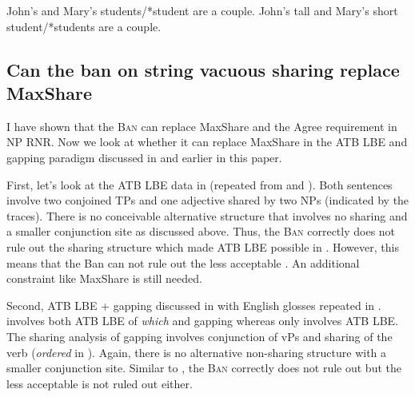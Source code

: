 \documentclass[output=paper]{langscibook}
\begin{document}
\ea 
	\label{shenex32}
	\ea 
		John's and Mary's students/*student are a couple.
	\ex 
		John's tall and Mary's short student/*students are a couple.
	\z 
\z 

\subsection{Can the ban on string vacuous sharing replace MaxShare}
\label{shensect:replace}

I have shown that the \textsc{Ban} can replace MaxShare and the Agree requirement in NP RNR. Now we look at whether it can replace MaxShare in the ATB LBE and gapping paradigm discussed in \citet{Citko:2006} and earlier in this paper.

First, let's look at the ATB LBE data in  (repeated from  and ). 
Both sentences involve two conjoined TPs and one adjective shared by two NPs (indicated by the traces). 
There is no conceivable alternative structure that involves no sharing and a smaller conjunction site as discussed above.  
Thus, the \textsc{Ban} correctly does not rule out the sharing structure which made ATB LBE possible in . 
However, this means that the Ban can not rule out the less acceptable . 
An additional constraint like MaxShare is still needed.

\ea 
	\label{shenex33}
	\z 
\z 
Second, ATB LBE + gapping discussed in  with English glosses repeated in .  involves both ATB LBE of \textit{which} and gapping whereas  only involves ATB LBE.
The sharing analysis of gapping involves conjunction of vPs and sharing of the verb (\textit{ordered} in ). Again, there is no alternative non-sharing structure with a smaller conjunction site. Similar to ,  the \textsc{Ban} correctly does not rule out  but the less acceptable  is not ruled out either.
\end{document}
